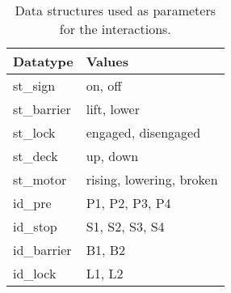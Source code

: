 \begin{table}[htb]%
\begin{tabular}{ll}
	\textbf{Datatype} & \textbf{Values}\\
	\hline
	st\_sign & on, off\\
	st\_barrier & lift, lower\\
	st\_lock & engaged, disengaged\\
	st\_deck & up, down\\
	st\_motor & rising, lowering, broken\\
	id\_pre & P1, P2, P3, P4\\
	id\_stop & S1, S2, S3, S4\\
	id\_barrier & B1, B2\\
	id\_lock & L1, L2\\
\end{tabular}
\caption{Data structures used as parameters for the interactions.}
\label{tab:types}
\end{table}
%

\newpage